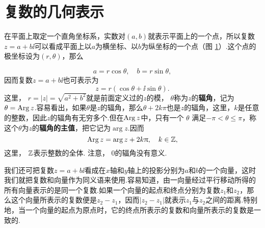 \section{复数的几何表示\label{sec1.2}}
在平面上取定一个直角坐标系，实数对$(a,b)$就表示平面上的一个点，所以复数$z=a+b\ii$可以看成平面上以$a$为横坐标、以$b$为纵坐标的一个点（图 \ref{fig1.1}）.这个点的极坐标设为$(r,\theta)$，那么
\begin{figure}[!ht]
  \centering
  \caption{}\label{fig1.1}
\end{figure}
\[
  a = r\cos\theta,\quad b = r\sin\theta,
\]
因而复数$z=a+b\ii$也可表示为
\[
  z = r(\cos\theta + \ii\sin\theta).
\]
这里， $r=|z|=\sqrt{a^2+b^2}$就是前面定义过的$z$的模， $\theta$称为$z$的\textbf{辐角}，记为$\theta=\operatorname{Arg} z$.容易看出，如果$\theta$是$z$的辐角，那么$\theta+2k\pi$也是$z$的辐角，这里，$k$是任意的整数，因此$z$的辐角有无穷多个.但在$\operatorname{Arg} z$中，只有一个 $\theta$ 满足$-\pi<\theta\le\pi$，称这个$\theta$为$z$的\textbf{辐角的主值}，把它记为$\arg z$.因而
\[
  \operatorname{Arg} z = \arg z + 2k\uppi,\quad k\in\mathbb Z,
\]
这里， $\mathbb Z$表示整数的全体. 注意， $0$的辐角没有意义.

我们还可把复数$z=a+b\ii$看成在$x$轴和$y$轴上的投影分别为$a$和$b$的一个向量，这时我们就把复数和向量作为同义语来使用.容易知道，由一向量经过平行移动所得的所有向量表示的是同一个复数.如果一个向量的起点和终点分别为复数$z_1$和$z_2$，那么这个向量所表示的复数便是$z_2-z_1$，因而$|z_2-z_1|$就表示$z_1$与$z_2$之间的距离.特别地，当一个向量的起点为原点时，它的终点所表示的复数和向量所表示的复数是一致的.

